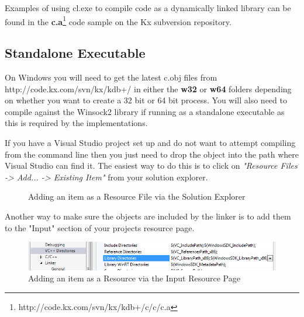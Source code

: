  Examples of using cl.exe to compile code as a dynamically linked library can be found in the
 \textbf{c.a}\footnote{http://code.kx.com/svn/kx/kdb+/c/c/c.a} code sample on the Kx subversion repository.
 
 \subsection{Standalone Executable}
 
 On Windows you will need to get the latest c.obj files from http://code.kx.com/svn/kx/kdb+/
 in either the \textbf{w32} or \textbf{w64} folders depending on whether you want to create a 32 bit or 64 bit
 process. You will also need to compile against the Winsock2 library if running as a standalone executable as this is required by the implementations.
 
 If you have a Visual Studio project set up and do not want to attempt compiling from the
 command line then you just need to drop the object into the path where Visual Studio can
 find it. The easiest way to do this is to click on \textit{"Resource Files -> Add... -> Existing Item"}
 from your solution explorer.
 
 \begin{figure}[h]
 	\centering
 	\caption{Adding an item as a Resource File via the Solution Explorer}
 	\label{addingvsresource}
 \end{figure}
 
 Another way to make sure the objects are included by the linker is to add them to the "Input"
 section of your projects resource page.
 
 \begin{figure}[h]
 	\centering
 	\includegraphics[scale=0.50]{figures/windows_vs2012_static_linking_dirs.png}
 	\caption{Adding an item as a Resource via the Input Resource Page}
 	\label{usingtheinputresourcepage}
 \end{figure}
 
